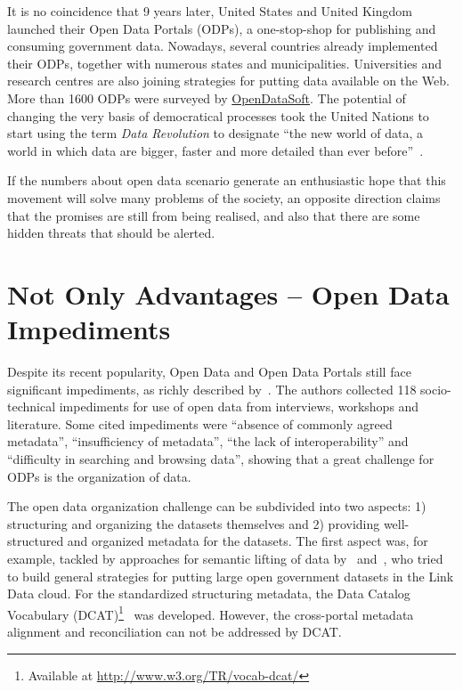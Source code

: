 It is no coincidence that 9 years later, United States and United Kingdom launched their Open Data Portals (ODPs), a one-stop-shop for publishing and consuming government data.
Nowadays, several countries already implemented their ODPs, together with numerous states and municipalities.
Universities and research centres are also joining strategies for putting data available on the Web.
More than 1600 ODPs were surveyed by \href{https://www.opendatasoft.com}{OpenDataSoft}.
The potential of changing the very basis of democratical processes took the United Nations to start using the term \emph{Data Revolution} to designate ``the new world of data, a world in which data are bigger, faster and more detailed than ever before''~\cite{DataRevolutionGroup2014}.

If the numbers about open data scenario generate an enthusiastic hope that this movement will solve many problems of the society, an opposite direction claims that the promises are still from being realised, and also that there are some hidden threats that should be alerted.

\section{Not Only Advantages -- Open Data Impediments}

Despite its recent popularity, Open Data and Open Data Portals still face significant impediments, as richly described by~.
The authors collected 118 socio-technical impediments for use of open data from interviews, workshops and literature.
Some cited impediments were ``absence of commonly agreed metadata'', ``insufficiency of metadata'', ``the lack of interoperability'' and ``difficulty in searching and browsing data'', showing that a great challenge for ODPs is the organization of data.

The open data organization challenge can be subdivided into two aspects: 1) structuring and organizing the datasets themselves and 2) providing well-structured and organized metadata for the datasets.
The first aspect was, for example, tackled by approaches for semantic lifting of data by~ and~, who tried to build general strategies for putting large open government datasets in the Link Data cloud.
For the standardized structuring metadata, the Data Catalog Vocabulary (DCAT)\footnote{Available at \url{http://www.w3.org/TR/vocab-dcat/}}~\cite{conf/i-semantics/CyganiakMP10} was developed.
However, the cross-portal metadata alignment and reconciliation can not be addressed by DCAT.

